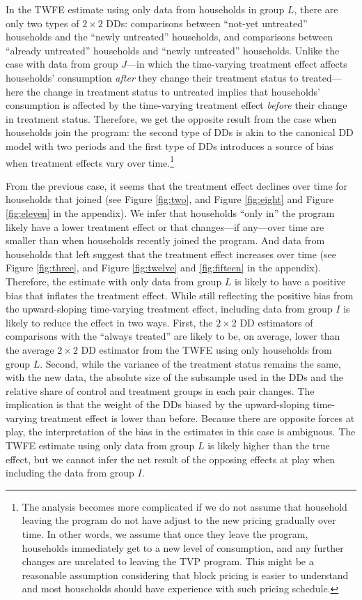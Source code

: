 \documentclass[12pt]{article}
\begin{document}
In the TWFE estimate using only data from households in group $L$, there are only two types of $2 \times 2$  DDs: comparisons between \enquote{not-yet untreated} households and the \enquote{newly untreated} households, and comparisons between \enquote{already untreated} households and \enquote{newly untreated} households. Unlike the case with data from group $J$---in which the time-varying treatment effect affects households’ consumption \emph{after} they change their treatment status to treated---here the change in treatment status to untreated implies that households’ consumption is affected by the time-varying treatment effect \emph{before} their change in treatment status. Therefore, we get the opposite result from the case when households join the program: the second type of DDs is akin to the canonical DD model with two periods and the first type of DDs introduces a source of bias when treatment effects vary over time.\footnote{The analysis becomes more complicated if we do not assume that household leaving the program do not have adjust to the new pricing gradually over time. In other words, we assume that once they leave the program, households immediately get to a new level of consumption, and any further changes are unrelated to leaving the TVP program. This might be a reasonable assumption considering that block pricing is easier to understand and most households should have experience with such pricing schedule.}

From the previous case, it seems that the treatment effect declines over time for households that joined (see Figure \ref{fig:two}, and Figure \ref{fig:eight} and Figure \ref{fig:eleven} in the appendix). We infer that households \enquote{only in} the program likely have a lower treatment effect or that changes---if any---over time are smaller than when households recently joined the program. And data from households that left suggest that the treatment effect increases over time (see Figure \ref{fig:three}, and Figure \ref{fig:twelve} and \ref{fig:fifteen} in the appendix). Therefore, the estimate with only data from group $L$ is likely to have a positive bias that inflates the treatment effect. While still reflecting the positive bias from the upward-sloping time-varying treatment effect, including data from group $I$ is likely to reduce the effect in two ways. First, the $2 \times 2 $ DD estimators of comparisons with the \enquote{always treated} are likely to be, on average, lower than the average  $2 \times 2$  DD estimator from the TWFE using only households from group $L$. Second, while the variance of the treatment status remains the same, with the new data, the absolute size of the subsample used in the DDs and the relative share of control and treatment groups in each pair changes. The implication is that the weight of the DDs biased by the upward-sloping time-varying treatment effect is lower than before. Because there are opposite forces at play, the interpretation of the bias in the estimates in this case is ambiguous. The TWFE estimate using only data from group $L$ is likely higher than the true effect, but we cannot infer the net result of the opposing effects at play when including the data from group $I$.
\end{document}
